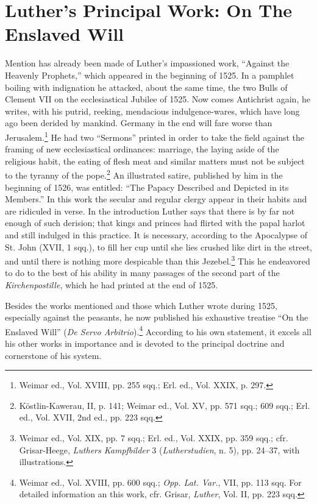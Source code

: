 \section{Luther’s Principal Work: On The Enslaved Will}

Mention has already been made of Luther’s impassioned work,
“Against the Heavenly Prophets,” which appeared in the beginning
of 1525. In a pamphlet boiling with indignation he attacked, about
the same time, the two Bulls of Clement VII on the ecclesiastical
Jubilee of 1525. Now comes Antichrist again, he writes, with his
putrid, reeking, mendacious indulgence-wares, which have long ago
been derided by mankind. Germany in the end will fare worse
than Jerusalem.\footnote{Weimar ed., Vol. XVIII, pp. 255 sqq.; Erl. ed., Vol. XXIX, p. 297.}
He had two “Sermons” printed in order to take the
field against the framing of new ecclesiastical ordinances: marriage,
the laying aside of the religious habit, the eating of flesh meat and
similar matters must not be subject to the tyranny of the pope.\footnote
{Köstlin-Kawerau, II, p. 141; Weimar ed., Vol. XV, pp. 571 sqq.; 609 sqq.; Erl. ed.,
Vol. XVII, 2nd ed., pp. 223 sqq.}
An illustrated satire, published by him in the beginning of 1526,
was entitled: “The Papacy Described and Depicted in its Members.”
In this work the secular and regular clergy appear in their habits
and are ridiculed in verse. In the introduction Luther says that there
is by far not enough of such derision; that kings and princes had
flirted with the papal harlot and still indulged in this practice. It
is necessary, according to the Apocalypse of St. John (XVII, 1 sqq.),
to fill her cup until she lies crushed like dirt in the street, and until
there is nothing more despicable than this Jezebel.\footnote
{Weimar ed., Vol. XIX, pp. 7 sqq.; Erl. ed., Vol. XXIX, pp. 359 sqq.; cfr. Grisar-Heege,
\textit{Luthers Kampfbilder} 3 (\textit{Lutherstudien}, n. 5), pp. 24--37, with illustrations.}
This he endeavored to do to the best of his ability in many passages of the
second part of the \textit{Kirchenpostille}, which he had printed at the
end of 1525.

Besides the works mentioned and those which Luther wrote during 1525,
especially against the peasants, he now published his exhaustive
treatise “On the Enslaved Will” (\textit{De Servo Arbitrio}).\footnote
{Weimar ed., Vol. XVIII, pp. 600 sqq.; \textit{Opp. Lat. Var.}, VII, pp. 113 sqq. For detailed
information an this work, cfr. Grisar, \textit{Luther}, Vol. II, pp. 223 sqq.}
According to his own statement, it excels all his other works in
importance and is devoted to the principal doctrine and cornerstone
of his system.

